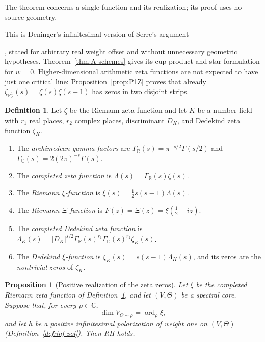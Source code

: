 \documentclass[11pt]{amsart}
\theoremstyle{plain}
\newtheorem{proposition}[theorem]{Proposition}
\theoremstyle{definition}
\newtheorem{definition}[theorem]{Definition}
\theoremstyle{remark}
\numberwithin{equation}{section}
\newcommand{\C}{\mathbb{C}}
\newcommand{\Z}{\mathbb{Z}}
\newcommand{\GR}{\Gamma_{\mathbb{R}}}
\newcommand{\GC}{\Gamma_{\mathbb{C}}}
\DeclareMathOperator{\ord}{ord}
\begin{document}
The theorem concerns a single function and its realization; its proof
uses no source geometry.

This is Deninger's infinitesimal version of Serre's argument

\cite[(7.11)--(7.13), pp.~32--33]{Deninger1994Motivic}, stated for
arbitrary real weight offset and without unnecessary geometric
hypotheses. Theorem~\ref{thm:A-schemes} gives its cup-product and
star formulation for $w=0$. Higher-dimensional arithmetic zeta
functions are not expected to have just one critical line:
Proposition~\ref{prop:P1Z} proves that already
$\zeta_{\mathbb{P}^1_\Z}(s)=\zeta(s)\zeta(s-1)$ has zeros in two
disjoint strips.

\begin{definition}\label{def:zeta}
Let $\zeta$ be the Riemann zeta function and let $K$ be a number field
with $r_1$ real places, $r_2$ complex places, discriminant $D_K$, and
Dedekind zeta function $\zeta_K$.
\begin{enumerate}[label=(\alph*)]
\item The \emph{archimedean gamma factors} are
  $\GR(s)=\pi^{-s/2}\Gamma(s/2)$ and $\GC(s)=2(2\pi)^{-s}\Gamma(s)$.
\item The \emph{completed zeta function} is
  $\Lambda(s)=\GR(s)\zeta(s)$.
\item The \emph{Riemann $\xi$-function} is
  $\xi(s)=\tfrac12 s(s-1)\Lambda(s)$.
\item The \emph{Riemann $\Xi$-function} is $F(z)=\Xi(z)=\xi(\tfrac12-iz)$.
\item The \emph{completed Dedekind zeta function} is
  $\Lambda_K(s)=|D_K|^{s/2}\GR(s)^{r_1}\GC(s)^{r_2}\zeta_K(s)$.
\item The \emph{Dedekind $\xi$-function} is
  $\xi_K(s)=s(s-1)\Lambda_K(s)$, and its zeros are the
  \emph{nontrivial zeros} of $\zeta_K$.
\end{enumerate}
\end{definition}

\begin{proposition}[Positive realization of the zeta zeros]
\label{prop:rh-positive-zero}
Let $\xi$ be the completed Riemann zeta function of
Definition~\ref{def:zeta}, and let $(V,\Theta)$ be a spectral core.
Suppose that, for every $\rho\in\C$,
\[
\dim V_{\Theta\sim\rho}=\ord_\rho\xi,
\]
and let $h$ be a positive infinitesimal polarization of weight one
on $(V,\Theta)$ (Definition~\ref{def:inf-pol}). Then RH holds.
\end{proposition}
\end{document}
